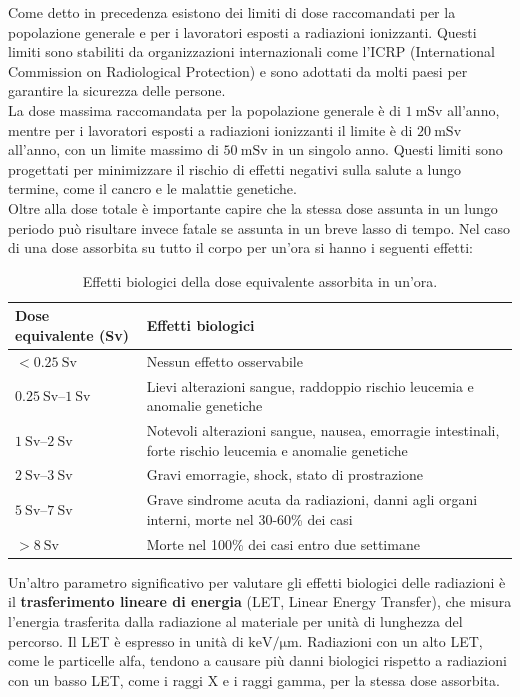 Come detto in precedenza esistono dei limiti di dose raccomandati per la popolazione generale e per i lavoratori esposti a radiazioni ionizzanti. Questi limiti sono stabiliti da organizzazioni internazionali come l'ICRP (International Commission on Radiological Protection) e sono adottati da molti paesi per garantire la sicurezza delle persone.\\
La dose massima raccomandata per la popolazione generale è di $\qty{1}{\milli\sievert}$ all'anno, mentre per i lavoratori esposti a radiazioni ionizzanti il limite è di $\qty{20}{\milli\sievert}$ all'anno, con un limite massimo di $\qty{50}{\milli\sievert}$ in un singolo anno. Questi limiti sono progettati per minimizzare il rischio di effetti negativi sulla salute a lungo termine, come il cancro e le malattie genetiche.\\
Oltre alla dose totale è importante capire che la stessa dose assunta in un lungo periodo può risultare invece fatale se assunta in un breve lasso di tempo. Nel caso di una dose assorbita su tutto il corpo per un'ora si hanno i seguenti effetti:
\begin{table}
    \centering
    \begin{tabular}{|p{5cm}|p{8cm}|}
        \hline
        \textbf{Dose equivalente (Sv)} & \textbf{Effetti biologici} \\
        \hline
        $<\qty{0.25}{\sievert}$ & Nessun effetto osservabile \\
        \hline
        $\qtyrange{0.25}{1}{\sievert}$ & Lievi alterazioni sangue, raddoppio rischio leucemia e anomalie genetiche \\
        \hline
        $\qtyrange{1}{2}{\sievert}$ & Notevoli alterazioni sangue, nausea, emorragie intestinali, forte rischio leucemia e anomalie genetiche \\
        \hline
        $\qtyrange{2}{3}{\sievert}$ & Gravi emorragie, shock, stato di prostrazione \\
        \hline
        $\qtyrange{5}{7}{\sievert}$ & Grave sindrome acuta da radiazioni, danni agli organi interni, morte nel 30-60\% dei casi \\
        \hline
        $>\qty{8}{\sievert}$ & Morte nel 100\% dei casi entro due settimane \\
        \hline
    \end{tabular}
    \caption{Effetti biologici della dose equivalente assorbita in un'ora.}
    \label{tab:biological_effects_radiation}
\end{table}
Un'altro parametro significativo per valutare gli effetti biologici delle radiazioni è il \textbf{trasferimento lineare di energia} (LET, Linear Energy Transfer), che misura l'energia trasferita dalla radiazione al materiale per unità di lunghezza del percorso. Il LET è espresso in unità di $\si{\kilo\electronvolt\per\micro\meter}$. Radiazioni con un alto LET, come le particelle alfa, tendono a causare più danni biologici rispetto a radiazioni con un basso LET, come i raggi X e i raggi gamma, per la stessa dose assorbita.\\
